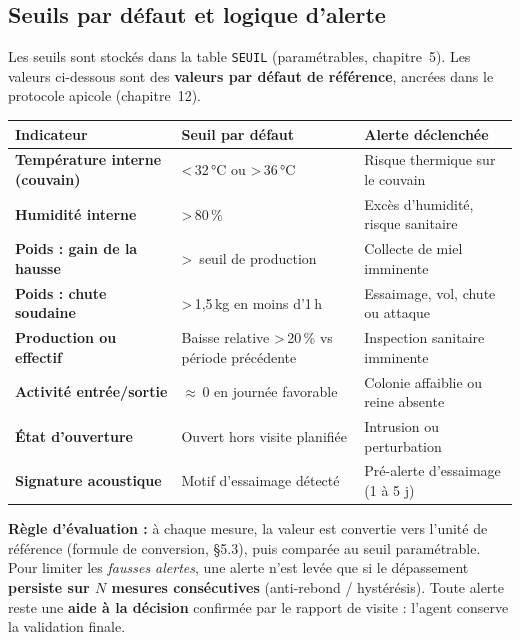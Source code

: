 \subsection{Seuils par défaut et logique d'alerte}
Les seuils sont stockés dans la table \texttt{SEUIL} (paramétrables, chapitre~5).
Les valeurs ci-dessous sont des \textbf{valeurs par défaut de référence}, ancrées
dans le protocole apicole (chapitre~12).
\begin{longtable}{>{\bfseries}p{4.4cm} p{5.2cm} p{4.4cm}}
\toprule
\textbf{Indicateur} & \textbf{Seuil par défaut} & \textbf{Alerte déclenchée} \\
\midrule
\endhead
Température interne (couvain) & \textless\,32\,°C ou \textgreater\,36\,°C & Risque thermique sur le couvain \\
Humidité interne & \textgreater\,80\,\% & Excès d'humidité, risque sanitaire \\
Poids : gain de la hausse & \textgreater\ seuil de production & Collecte de miel imminente \\
Poids : chute soudaine & \textgreater\,1,5\,kg en moins d'1\,h & Essaimage, vol, chute ou attaque \\
Production ou effectif & Baisse relative \textgreater\,20\,\% vs période précédente & Inspection sanitaire imminente \\
Activité entrée/sortie & $\approx$\,0 en journée favorable & Colonie affaiblie ou reine absente \\
État d'ouverture & Ouvert hors visite planifiée & Intrusion ou perturbation \\
Signature acoustique & Motif d'essaimage détecté & Pré-alerte d'essaimage (1 à 5 j) \\
\bottomrule
\end{longtable}
\begin{encadre}
\textbf{Règle d'évaluation :} à chaque mesure, la valeur est convertie vers
l'unité de référence (formule de conversion, §5.3), puis comparée au seuil
paramétrable. Pour limiter les \emph{fausses alertes}, une alerte n'est levée que
si le dépassement \textbf{persiste sur $N$ mesures consécutives} (anti-rebond /
hystérésis). Toute alerte reste une \textbf{aide à la décision} confirmée par le
rapport de visite : l'agent conserve la validation finale.
\end{encadre}

